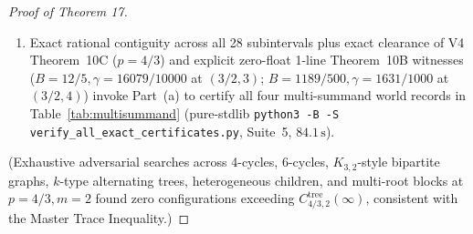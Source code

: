 \documentclass[10pt,letterpaper]{article}
\begin{document}
\begin{proof}[Proof of Theorem 17]
\begin{enumerate}[leftmargin=1.6em,itemsep=1.5pt]
  \item Exact rational contiguity across all 28 subintervals plus exact clearance of V4 Theorem~10C ($p = 4/3$) and explicit zero-float 1-line Theorem~10B witnesses ($B = 12/5, \gamma = 16079/10000$ at $(3/2, 3)$; $B = 1189/500, \gamma = 1631/1000$ at $(3/2, 4)$) invoke Part~(a) to certify all four multi-summand world records in Table~\ref{tab:multisummand} (pure-stdlib \texttt{python3 -B -S verify\_all\_exact\_certificates.py}, Suite~5, $84.1\,\mathrm{s}$).
\end{enumerate}
(Exhaustive adversarial searches across 4-cycles, 6-cycles, $K_{3,2}$-style bipartite graphs, $k$-type alternating trees, heterogeneous children, and multi-root blocks at $p = 4/3, m = 2$ found zero configurations exceeding $C_{4/3,2}^{\mathrm{tree}}(\infty)$, consistent with the Master Trace Inequality.)
\end{proof}
\end{document}
